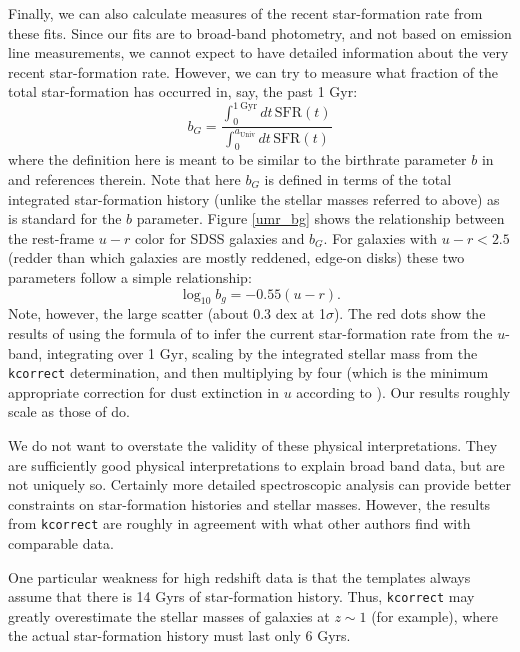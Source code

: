 \documentclass[10pt,preprint]{aastex}
\begin{document}
Finally, we can also calculate measures of the recent star-formation
rate from these fits. Since our fits are to broad-band photometry, and
not based on emission line measurements, we cannot expect to have
detailed information about the very recent star-formation
rate. However, we can try to measure what fraction of the total
star-formation has occurred in, say, the past 1 Gyr:
\begin{equation}
b_{G} = \frac{\int_0^{1\mathrm{~Gyr}} dt\, \mathrm{SFR}(t)}
{\int_0^{a_{\mathrm{Univ}}} dt\, \mathrm{SFR}(t)}
\end{equation}
where the definition here is meant to be similar to the birthrate
parameter $b$ in \citet{kennicutt94a} and references therein.  Note
that here $b_G$ is defined in terms of the total integrated
star-formation history (unlike the stellar masses referred to above)
as is standard for the $b$ parameter. Figure \ref{umr_bg} shows the
relationship between the rest-frame $u-r$ color for SDSS galaxies and
$b_G$. For galaxies with $u-r < 2.5$ (redder than which galaxies are
mostly reddened, edge-on disks) these two parameters follow a simple
relationship:
\begin{equation}
\log_{10} b_g = -0.55 (u-r). 
\end{equation}
Note, however, the large scatter (about 0.3 dex at 1$\sigma$).  The
red dots show the results of using the formula of \citet{hopkins03a}
to infer the current star-formation rate from the $u$-band,
integrating over 1 Gyr, scaling by the integrated stellar mass from
the {\tt kcorrect} determination, and then multiplying by four (which
is the minimum appropriate correction for dust extinction in $u$
according to \citealt{hopkins03a}). Our results roughly scale as those
of \citet{hopkins03a} do.

We do not want to overstate the validity of these physical
interpretations. They are sufficiently good physical interpretations
to explain broad band data, but are not uniquely so. Certainly more
detailed spectroscopic analysis can provide better constraints on
star-formation histories and stellar masses.  However, the results
from {\tt kcorrect} are roughly in agreement with what other authors
find with comparable data.

One particular weakness for high redshift data is that the templates
always assume that there is 14 Gyrs of star-formation history.  Thus,
{\tt kcorrect} may greatly overestimate the stellar masses of galaxies
at $z \sim 1$ (for example), where the actual star-formation history
must last only 6 Gyrs.
\end{document}
